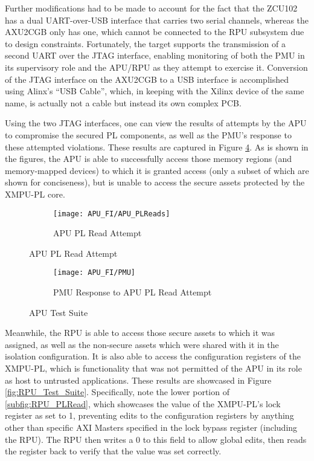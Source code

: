 Further modifications had to be made to account for the fact that the ZCU102 has a dual UART-over-USB interface that carries two serial channels, whereas the AXU2CGB only has one, which cannot be connected to the RPU subsystem due to design constraints. Fortunately, the target supports the transmission of a second UART over the JTAG interface, enabling monitoring of both the PMU in its supervisory role and the APU/RPU as they attempt to exercise it. Conversion of the JTAG interface on the AXU2CGB to a USB interface is accomplished using Alinx's ``USB Cable'', which, in keeping with the Xilinx device of the same name, is actually not a cable but instead its own complex PCB.

Using the two JTAG interfaces, one can view the results of attempts by the APU to compromise the secured PL components, as well as the PMU's response to these attempted violations. These results are captured in Figure \ref{fig:APU_Test_Suite}. As is shown in the figures, the APU is able to successfully access those memory regions (and memory-mapped devices) to which it is granted access (only a subset of which are shown for conciseness), but is unable to access the secure assets protected by the XMPU-PL core.

\begin{figure}[H]
    \centering
    \begin{subfigure}[b]{0.8\textwidth}
        \texttt{[image: APU\_FI/APU\_PLReads]}
        \caption{APU PL Read Attempt}
        \label{subfig:APU_PLRead}
    \end{subfigure}
\end{figure}
\begin{figure}[H]
    \ContinuedFloat
    \centering
    \begin{subfigure}[b]{0.8\textwidth}
        \texttt{[image: APU\_FI/PMU]}
        \caption{PMU Response to APU PL Read Attempt}
        \label{subfig:APU_PMU_Response}
    \end{subfigure}
    \caption{APU Test Suite}
    \label{fig:APU_Test_Suite}
\end{figure}

Meanwhile, the RPU is able to access those secure assets to which it was assigned, as well as the non-secure assets which were shared with it in the isolation configuration. It is also able to access the configuration registers of the XMPU-PL, which is functionality that was not permitted of the APU in its role as host to untrusted applications. These results are showcased in Figure \ref{fig:RPU_Test_Suite}. Specifically, note the lower portion of \ref{subfig:RPU_PLRead}, which showcases the value of the XMPU-PL's lock register as set to 1, preventing edits to the configuration registers by anything other than specific AXI Masters specified in the lock bypass register (including the RPU). The RPU then writes a 0 to this field to allow global edits, then reads the register back to verify that the value was set correctly.

